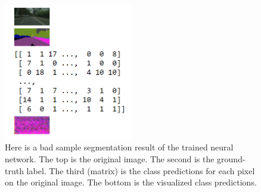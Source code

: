 \documentclass[10pt,twocolumn,letterpaper]{article}
\begin{document}
\begin{figure}[t]
	\centering
	\includegraphics[width=0.50\textwidth]{bad_result.PNG}
	\caption{Here is a bad sample segmentation result of the trained neural network. The top is the original image. The second is the ground-truth label. The third (matrix) is the class predictions for each pixel on the original image. The bottom is the visualized class predictions.}
	\label{fig:leadfigure}
\end{figure}


{\small


}
\end{document}
